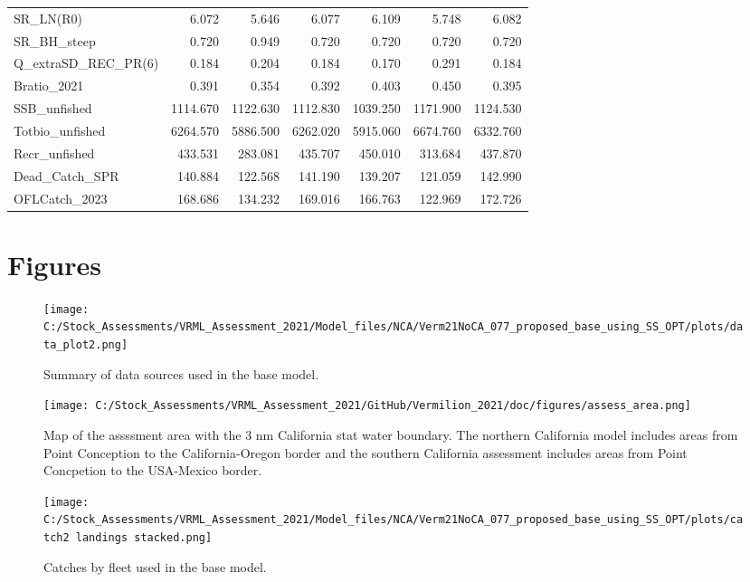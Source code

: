 \documentclass[
  english,
  a4paper,
]{article}
\begin{document}
\begin{table}
{\begin{tabular}[t]{lrrrrrr}
SR\_LN(R0) & 6.072 & 5.646 & 6.077 & 6.109 & 5.748 & 6.082\\
SR\_BH\_steep & 0.720 & 0.949 & 0.720 & 0.720 & 0.720 & 0.720\\
Q\_extraSD\_REC\_PR(6) & 0.184 & 0.204 & 0.184 & 0.170 & 0.291 & 0.184\\
Bratio\_2021 & 0.391 & 0.354 & 0.392 & 0.403 & 0.450 & 0.395\\
SSB\_unfished & 1114.670 & 1122.630 & 1112.830 & 1039.250 & 1171.900 & 1124.530\\
Totbio\_unfished & 6264.570 & 5886.500 & 6262.020 & 5915.060 & 6674.760 & 6332.760\\
Recr\_unfished & 433.531 & 283.081 & 435.707 & 450.010 & 313.684 & 437.870\\
Dead\_Catch\_SPR & 140.884 & 122.568 & 141.190 & 139.207 & 121.059 & 142.990\\
OFLCatch\_2023 & 168.686 & 134.232 & 169.016 & 166.763 & 122.969 & 172.726\\
\bottomrule
\end{tabular}}
\end{table}

\clearpage

\hypertarget{figures}{%
\section{Figures}\label{figures}}

\begin{figure}
\centering
\texttt{[image: C:/Stock\_Assessments/VRML\_Assessment\_2021/Model\_files/NCA/Verm21NoCA\_077\_proposed\_base\_using\_SS\_OPT/plots/data\_plot2.png]}
\caption{Summary of data sources used in the base model.\label{fig:data-plot}}
\end{figure}

\begin{figure}
\centering
\texttt{[image: C:/Stock\_Assessments/VRML\_Assessment\_2021/GitHub/Vermilion\_2021/doc/figures/assess\_area.png]}
\caption{Map of the assssment area with the 3 nm California stat water boundary. The northern California model includes areas from Point Conception to the California-Oregon border and the southern California assessment includes areas from Point Concpetion to the USA-Mexico border.\label{fig:assess-area}}
\end{figure}

\begin{figure}
\centering
\texttt{[image: C:/Stock\_Assessments/VRML\_Assessment\_2021/Model\_files/NCA/Verm21NoCA\_077\_proposed\_base\_using\_SS\_OPT/plots/catch2 landings stacked.png]}
\caption{Catches by fleet used in the base model.\label{fig:catch}}
\end{figure}
\end{document}
